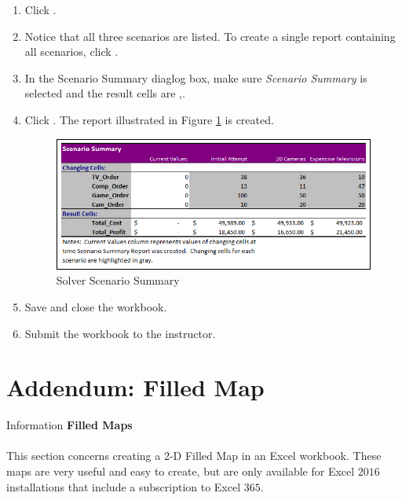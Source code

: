 \begin{enumerate}[resume]
	\item Click .
	\item Notice that all three scenarios are listed. To create a single report containing all scenarios, click .
	\item In the Scenario Summary diaglog box, make sure \textit{Scenario Summary} is selected and the result cells are ,.
	\item Click . The report illustrated in Figure \ref{08:fig83} is created.

	\begin{figure}[H]
		\centering
		\includegraphics[width=\maxwidth{.95\linewidth}]{gfx/ch08_fig83}
		\caption{Solver Scenario Summary}
		\label{08:fig83}
	\end{figure}
	\item Save and close the  workbook.
	\item Submit the  workbook to the instructor.
\end{enumerate}

\section{Addendum: Filled Map}

\begin{center}
	\begin{infobox}{Information}
		\textbf{Filled Maps}
		\\
		\\
		This section concerns creating a 2-D Filled Map in an Excel workbook. These maps are very useful and easy to create, but are only available for Excel $ 2016 $ installations that include a subscription to Excel $ 365 $.
	\end{infobox}
\end{center}

